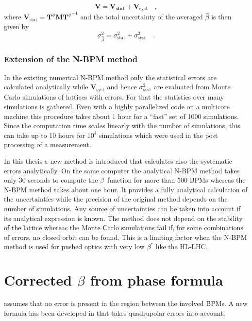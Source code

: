 \begin{equation}
\mathbf{V} = \mathbf{V_\text{stat}} + \mathbf{V}_\text{syst}\quad ,
\label{eq:V1}
\end{equation}
where $ \mathbf{V}_\text{stat} = \mathbf{T}^\phi \mathbf{M} {\mathbf{T}^{\phi}}^{-1}$ and the total uncertainty of the averaged $ \hat{\beta} $ is then given by
\begin{equation}
\sigma_{\hat{\beta}}^2 = \sigma_\text{stat}^2 + \sigma_\text{syst}^2\quad .
\end{equation}

\subsubsection{Extension of the N-BPM method}

In the existing numerical N-BPM method only the statistical errors are calculated analytically while
$\mathbf{V}_\text{syst}$ and hence $\sigma_\text{syst}^2$ are evaluated from Monte Carlo simulations
of lattices with errors.
For that the statistics over many simulations is gathered.
Even with a highly parallelized code on a multicore machine this procedure takes about 1 hour for a
``fast'' set of 1000 simulations. Since the computation time scales linearly with the number of simulations,
this can take up to 10 hours for $10^{4}$ simulations which were used in the post processing of a measurement.

In this thesis a new method is introduced that calculates also the systematic errors analytically. 
On the same computer the analytical N-BPM method takes only 30 seconds to compute the $ \beta $~function
for more than 500 BPMs whereas the N-BPM method takes about one hour.
It provides a fully analytical calculation of the uncertainties while the precision of the original
method depends on the number of simulations. Any source of uncertainties can be taken into account
if its analytical expression is known. The method does not depend on the stability of the lattice whereas
the Monte Carlo simulations fail if, for some combinations of errors, no closed orbit can be found.
This is a limiting factor when the N-BPM method is used for pushed optics with very low $ \beta^* $ like the HL-LHC. 


\section{Corrected $\beta$ from phase formula}
 assumes that no error is present in the region between the involved BPMs.
A new formula has been developed in \cite{Franchi:2016tfi} that takes quadrupolar errors into account,

